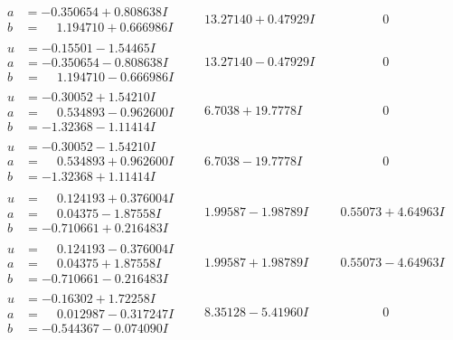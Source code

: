 \documentclass[1p]{elsarticle_modified}
\theoremstyle{definition}
\begin{document}
$$\begin{array}{c|c|c}
\begin{aligned}
a &= -0.350654 + 0.808638 I \\
b &= \phantom{-}1.194710 + 0.666986 I\end{aligned}
 & \phantom{-}13.27140 + 0.47929 I & \phantom{-0.000000 } 0 \\ \hline\begin{aligned}
u &= -0.15501 - 1.54465 I \\
a &= -0.350654 - 0.808638 I \\
b &= \phantom{-}1.194710 - 0.666986 I\end{aligned}
 & \phantom{-}13.27140 - 0.47929 I & \phantom{-0.000000 } 0 \\ \hline\begin{aligned}
u &= -0.30052 + 1.54210 I \\
a &= \phantom{-}0.534893 - 0.962600 I \\
b &= -1.32368 - 1.11414 I\end{aligned}
 & \phantom{-}6.7038 + 19.7778 I & \phantom{-0.000000 } 0 \\ \hline\begin{aligned}
u &= -0.30052 - 1.54210 I \\
a &= \phantom{-}0.534893 + 0.962600 I \\
b &= -1.32368 + 1.11414 I\end{aligned}
 & \phantom{-}6.7038 - 19.7778 I & \phantom{-0.000000 } 0 \\ \hline\begin{aligned}
u &= \phantom{-}0.124193 + 0.376004 I \\
a &= \phantom{-}0.04375 - 1.87558 I \\
b &= -0.710661 + 0.216483 I\end{aligned}
 & \phantom{-}1.99587 - 1.98789 I & \phantom{-}0.55073 + 4.64963 I \\ \hline\begin{aligned}
u &= \phantom{-}0.124193 - 0.376004 I \\
a &= \phantom{-}0.04375 + 1.87558 I \\
b &= -0.710661 - 0.216483 I\end{aligned}
 & \phantom{-}1.99587 + 1.98789 I & \phantom{-}0.55073 - 4.64963 I \\ \hline\begin{aligned}
u &= -0.16302 + 1.72258 I \\
a &= \phantom{-}0.012987 - 0.317247 I \\
b &= -0.544367 - 0.074090 I\end{aligned}
 & \phantom{-}8.35128 - 5.41960 I & \phantom{-0.000000 } 0\\

\end{array}$$
\end{document}
